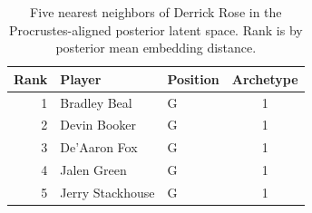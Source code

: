 \begin{table}[htbp]
  \centering\small
  \begin{tabular}{rllc}
    \toprule
    Rank & Player & Position & Archetype \\
    \midrule
    1 & Bradley Beal & G & 1 \\
    2 & Devin Booker & G & 1 \\
    3 & De'Aaron Fox & G & 1 \\
    4 & Jalen Green & G & 1 \\
    5 & Jerry Stackhouse & G & 1 \\
    \bottomrule
  \end{tabular}
  \caption{Five nearest neighbors of Derrick Rose in the Procrustes-aligned posterior latent space. Rank is by posterior mean embedding distance.}
  \label{tab:Derrick_Rose_neighbors}
\end{table}

